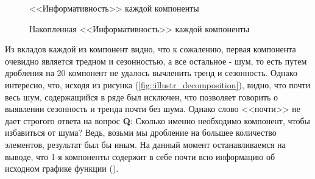 \begin{figure}[H]
	\centering
	\caption{<<Информативность>> каждой компоненты}
\end{figure}

\begin{figure}[H]
	\centering
	\caption{Накопленная <<Информативность>> каждой компоненты}
\end{figure}
Из вкладов каждой из компонент видно, что к сожалению, первая компонента очевидно является тредном и сезонностью, а все остальное - шум, то есть путем дробления на 20 компонент не удалось вычленить тренд и сезонность. Однако интересно, что, исходя из рисунка (\ref{fig::illustr_decomposition}), видно, что почти весь шум, содержащийся в ряде был исключен, что позволяет говорить о выявлении сезонность и тренда почти без шума. Однако слово <<почти>> не дает строгого ответа на вопрос \textbf{Q}:  Сколько именно необходимо компонент, чтобы избавиться от шума? Ведь, возьми мы дробление на большее количество элементов, результат был бы иным. На данный момент останавливаемся на выводе, что 1-я компоненты содержит в себе почти всю информацию об исходном графике функции (). 

